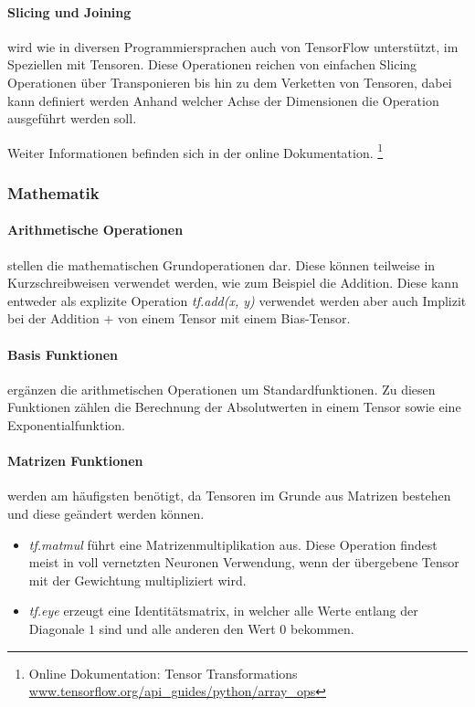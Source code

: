 \paragraph{Slicing und Joining} wird wie in diversen Programmiersprachen auch von TensorFlow unterstützt, im Speziellen mit Tensoren. 
Diese Operationen reichen von einfachen Slicing Operationen über Transponieren bis hin zu dem Verketten von Tensoren, dabei kann definiert werden Anhand welcher Achse der Dimensionen die Operation ausgeführt werden soll. 
\phantom \newline

\noindent
Weiter Informationen befinden sich in der online Dokumentation. \footnote{Online Dokumentation: Tensor Transformations \url{www.tensorflow.org/api_guides/python/array_ops}}

\subsubsection{Mathematik} 

\paragraph{Arithmetische Operationen} stellen die mathematischen Grundoperationen dar. 
Diese können teilweise in Kurzschreibweisen verwendet werden, wie zum Beispiel die Addition. 
Diese kann entweder als explizite Operation \textit{tf.add(x, y)} verwendet werden aber auch Implizit bei der Addition $+$ von einem Tensor mit einem Bias-Tensor.

\paragraph{Basis Funktionen} ergänzen die arithmetischen Operationen um Standardfunktionen. 
Zu diesen Funktionen zählen die Berechnung der Absolutwerten in einem Tensor sowie eine Exponentialfunktion. 

\paragraph{Matrizen Funktionen} werden am häufigsten benötigt, da Tensoren im Grunde aus Matrizen bestehen und  diese geändert werden können. 
\begin{itemize}
	\item \textit{tf.matmul} führt eine Matrizenmultiplikation aus. 
	Diese Operation findest meist in voll vernetzten Neuronen Verwendung, wenn der übergebene Tensor mit der Gewichtung multipliziert wird. 
	\item \textit{tf.eye} erzeugt eine Identitätsmatrix, in welcher alle Werte entlang der Diagonale $1$ sind und alle anderen den Wert $0$ bekommen. 
\end{itemize}

